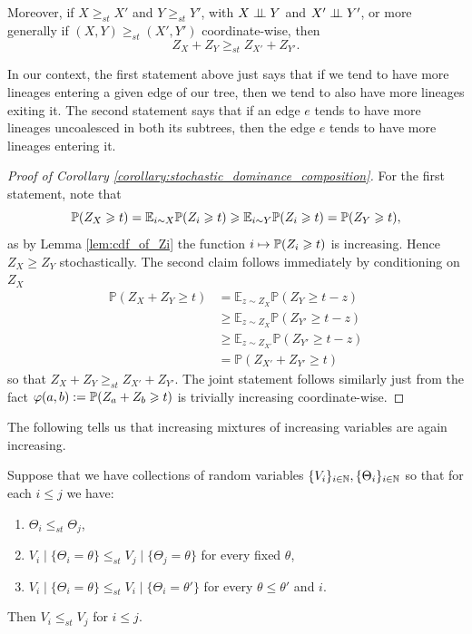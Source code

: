 \begin{subappendices}
\begin{corollary}
    \noindent Moreover, if $X \geq_{st} X'$ and $Y \geq_{st} Y'$, with
    $X \indep Y$ and $X' \indep Y'$, or more generally if
    $(X,Y) \geq_{st} (X',Y')$ coordinate-wise, then
        \[Z_X + Z_{Y} \geq_{st} Z_{X'}+ Z_{Y'}.\]
\end{corollary}

\noindent In our context, the first statement above just says that if we tend to have more lineages entering a given edge of our tree, then we tend to also have more lineages exiting it. The second statement says that if an edge $e$ tends to have more lineages uncoalesced in both its subtrees, then the edge $e$ tends to have more lineages entering it.

\begin{proof}[Proof of Corollary \ref{corollary:stochastic_dominance_composition}]
    For the first statement, note that
    \[\P(Z_X \geq t) = \E_{i \sim X} \P(Z_i \geq t) \geq \E_{i \sim Y} \P(Z_i \geq t) = \P(Z_Y \geq t),\]
    \noindent as by Lemma \ref{lem:cdf_of_Zi} the function $i \mapsto \P(Z_i \geq t)$ is increasing. Hence $Z_X \geq Z_Y$ stochastically. The second claim follows immediately by conditioning on $Z_X$
    \begin{align*}
        \mathbb{P}(Z_X + Z_Y \geq t) &= \mathbb{E}_{z \sim Z_X} \mathbb{P}(Z_Y \geq t-z) \\
        &\geq \mathbb{E}_{z \sim Z_X} \mathbb{P}(Z_{Y'} \geq t-z) \\
        &\geq \mathbb{E}_{z \sim Z_{X'}} \mathbb{P}(Z_{Y'} \geq t-z) \\
        &= \mathbb{P}(Z_{X'} + Z_{Y'} \geq t)
    \end{align*}
    \noindent so that $Z_X + Z_Y \geq_{st} Z_{X'} + Z_{Y'}$. The joint statement follows similarly just from the fact $\phi(a,b) := \P(Z_a + Z_b \geq t)$ is trivially increasing coordinate-wise.
\end{proof}


\noindent The following tells us that increasing mixtures of increasing variables are again increasing.
\begin{lemma}
\label{lem:mixtures_and_stochastic_dominance}
    Suppose that we have collections of random variables $\{V_i\}_{i \in \N}, \{\Theta_i\}_{i \in \N}$ so that for each $i \leq j$ we have:
    \begin{enumerate}[label=\alph*)]
        \item $\Theta_i \leq_{st} \Theta_j$,
        \item $V_i \mid \{\Theta_i = \theta\} \leq_{st} V_j \mid \{\Theta_j = \theta\}$ for every fixed $\theta$,
         \item $V_i \mid \{\Theta_i = \theta\} \leq_{st} V_i \mid \{\Theta_i = \theta'\}$ for every $\theta \leq \theta'$ and $i$.
    \end{enumerate}
    \noindent Then $V_i \leq_{st} V_j$ for $i \leq j$.
\end{lemma}


\end{subappendices}
